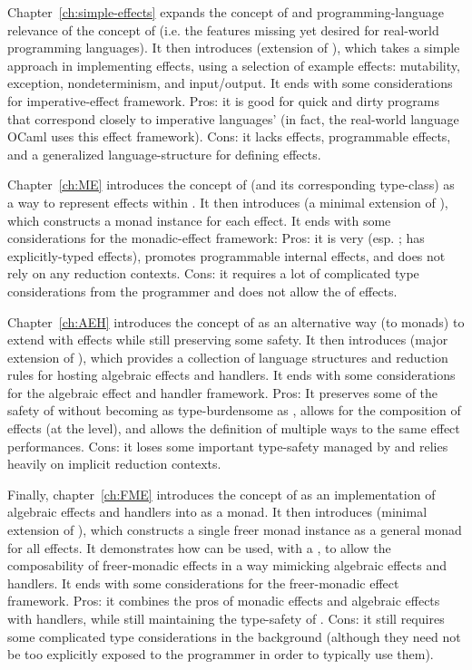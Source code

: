 Chapter~\ref{ch:simple-effects} expands the concept of and programming-language relevance of the concept of  (i.e. the features missing yet desired for real-world programming languages).
It then introduces \LangB (extension of \LangA), which takes a simple approach in implementing  effects, using a selection of example effects: mutability, exception, nondeterminism, and input/output.
It ends with some considerations for imperative-effect framework.
Pros: it is good for quick and dirty programs that correspond closely to imperative languages' (in fact, the real-world language OCaml uses this effect framework).
Cons: it  lacks  effects, programmable  effects, and a generalized language-structure for defining effects.

Chapter~\ref{ch:ME} introduces the concept of  (and its corresponding type-class) as a way to represent effects within \LangA.
It then introduces \LangC (a minimal extension of \LangA), which constructs a monad instance for each effect.
It ends with some considerations for the monadic-effect framework:
Pros: it is very  (esp. ; has explicitly-typed effects), promotes programmable internal effects, and does not rely on any reduction contexts.
Cons: it requires a lot of complicated type considerations from the programmer and does not allow the  of effects.

Chapter~\ref{ch:AEH} introduces the concept of  as an alternative way (to monads) to extend \LangA with effects while still preserving some safety.
It then introduces \LangD (major extension of \LangA), which provides a collection of language structures and reduction rules for hosting algebraic effects and handlers.
It ends with some considerations for the algebraic effect and handler framework.
Pros: It preserves some of the safety of \LangA without becoming as type-burdensome as \LangC, allows for the composition of effects (at the  level), and allows the definition of multiple ways to  the same effect performances.
Cons: it loses some important type-safety managed by \LangC and relies heavily on implicit reduction contexts.

Finally, chapter~\ref{ch:FME} introduces the concept of  as an implementation of algebraic effects and handlers into \LangC as a monad.
It then introduces \LangE (minimal extension of \LangC), which constructs a single freer monad instance as a general monad for all effects.
It demonstrates how \LangE can be used, with a , to allow the composability of freer-monadic effects in a way mimicking algebraic effects and handlers.
It ends with some considerations for the freer-monadic effect framework.
Pros: it combines the pros of monadic effects and algebraic effects with handlers, while still maintaining the type-safety of \LangA.
Cons: it still requires some complicated type considerations in the background (although they need not be too explicitly exposed to the programmer in order to typically use them).

